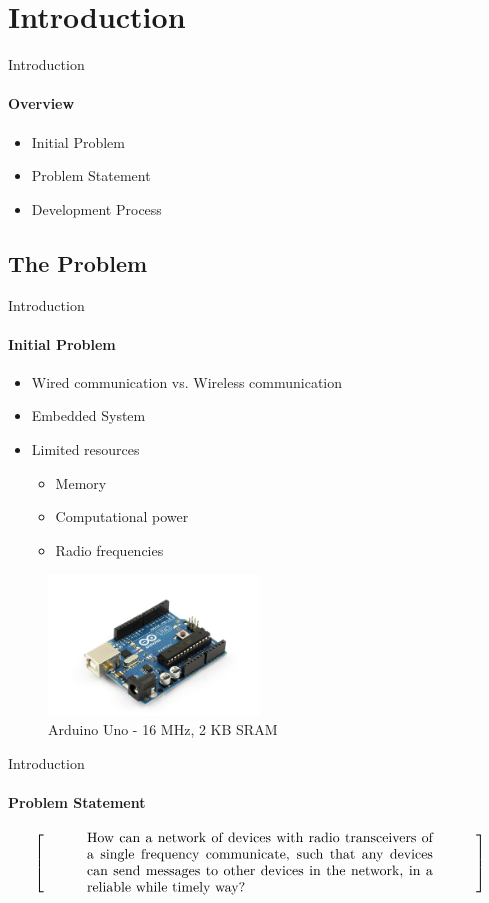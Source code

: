 \section{Introduction}
\begin{frame}{Introduction}\framesubtitle{Overview}
    \begin{itemize}
        \item Initial Problem
        \item Problem Statement
        \item Development Process 
    \end{itemize}
\end{frame}
\subsection{The Problem}
\begin{frame}[t]{Introduction}\framesubtitle{Initial Problem}
	\begin{itemize}
        \item Wired communication vs. Wireless communication
        \item Embedded System 
        \item Limited resources
            \begin{itemize}
                \item Memory
                \item Computational power
                \item Radio frequencies
            \end{itemize}
    \end{itemize}
    \begin{figure}
        \footnotesize
        \centering
        \includegraphics[width=0.5\textwidth,trim={3cm 0.5cm 3cm 3cm},clip]{images/arduino_uno.jpg}
        \caption{Arduino Uno - 16 MHz, 2 KB SRAM}
    \end{figure}
\end{frame}
\begin{frame}{Introduction}\framesubtitle{Problem Statement}
\[
\left[
\begin{minipage}{0.9\textwidth}
\centering
\begin{minipage}{0.8\textwidth}
How can a network of devices with radio transceivers of a single frequency communicate, such that any devices can send messages to other devices in the network, in a reliable while timely way?
\end{minipage}
\end{minipage}
\right]
\]
\end{frame}
